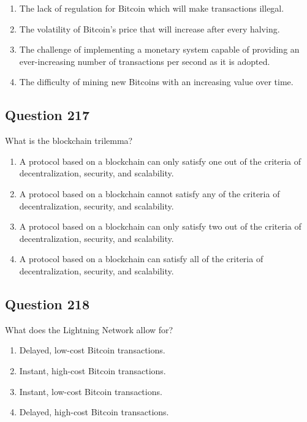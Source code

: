 \documentclass[12pt,a4paper]{article}
\begin{document}
\begin{enumerate}[label=\Alph*., leftmargin=*]
\item The lack of regulation for Bitcoin which will make transactions illegal.
\item The volatility of Bitcoin's price that will increase after every halving.
\item The challenge of implementing a monetary system capable of providing an ever-increasing number of transactions per second as it is adopted.
\item The difficulty of mining new Bitcoins with an increasing value over time.
\end{enumerate}

\bigskip


\subsection*{Question 217}
What is the blockchain trilemma?

\begin{enumerate}[label=\Alph*., leftmargin=*]
\item A protocol based on a blockchain can only satisfy one out of the criteria of decentralization, security, and scalability.
\item A protocol based on a blockchain cannot satisfy any of the criteria of decentralization, security, and scalability.
\item A protocol based on a blockchain can only satisfy two out of the criteria of decentralization, security, and scalability.
\item A protocol based on a blockchain can satisfy all of the criteria of decentralization, security, and scalability.
\end{enumerate}

\bigskip


\subsection*{Question 218}
What does the Lightning Network allow for?

\begin{enumerate}[label=\Alph*., leftmargin=*]
\item Delayed, low-cost Bitcoin transactions.
\item Instant, high-cost Bitcoin transactions.
\item Instant, low-cost Bitcoin transactions.
\item Delayed, high-cost Bitcoin transactions.
\end{enumerate}
\end{document}

